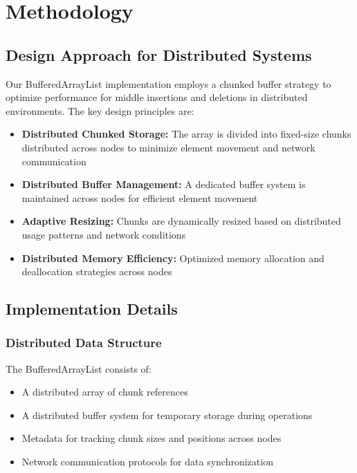 \section{Methodology}
\label{sec:methodology}

\subsection{Design Approach for Distributed Systems}

Our BufferedArrayList implementation employs a chunked buffer strategy to optimize performance for middle insertions and deletions in distributed environments. The key design principles are:

\begin{itemize}
    \item \textbf{Distributed Chunked Storage:} The array is divided into fixed-size chunks distributed across nodes to minimize element movement and network communication
    \item \textbf{Distributed Buffer Management:} A dedicated buffer system is maintained across nodes for efficient element movement
    \item \textbf{Adaptive Resizing:} Chunks are dynamically resized based on distributed usage patterns and network conditions
    \item \textbf{Distributed Memory Efficiency:} Optimized memory allocation and deallocation strategies across nodes
\end{itemize}

\subsection{Implementation Details}

\subsubsection{Distributed Data Structure}

The BufferedArrayList consists of:
\begin{itemize}
    \item A distributed array of chunk references
    \item A distributed buffer system for temporary storage during operations
    \item Metadata for tracking chunk sizes and positions across nodes
    \item Network communication protocols for data synchronization
\end{itemize}

